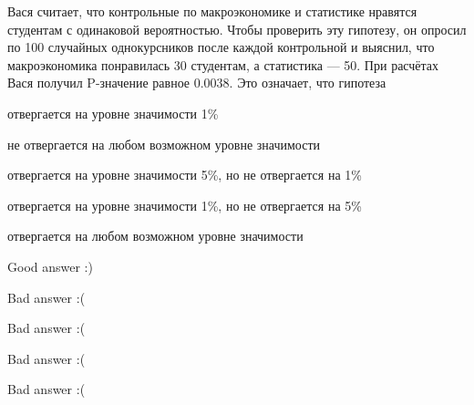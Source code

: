 
\begin{question}
Вася считает, что контрольные по макроэкономике и статистике нравятся
студентам с одинаковой вероятностью. Чтобы проверить эту гипотезу, он
опросил по 100 случайных однокурсников после каждой контрольной и
выяснил, что макроэкономика понравилась 30 студентам, а статистика ---
50. При расчётах Вася получил P-значение равное 0.0038. Это означает,
что гипотеза
\begin{answerlist}
  \item отвергается на уровне значимости 1\%
  \item не отвергается на любом возможном уровне значимости
  \item отвергается на уровне значимости 5\%, но не отвергается на 1\%
  \item отвергается на уровне значимости 1\%, но не отвергается на 5\%
  \item отвергается на любом возможном уровне значимости
\end{answerlist}
\end{question}

\begin{solution}
\begin{answerlist}
  \item Good answer :)
  \item Bad answer :(
  \item Bad answer :(
  \item Bad answer :(
  \item Bad answer :(
\end{answerlist}
\end{solution}

